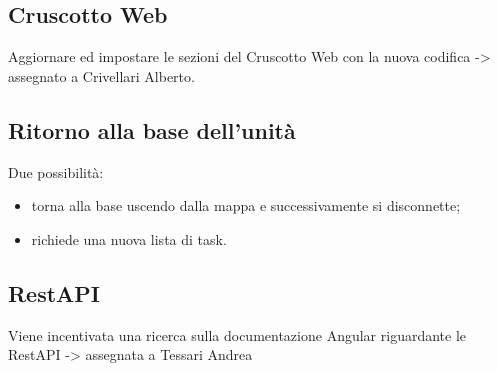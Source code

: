 \subsection{Cruscotto Web}
Aggiornare ed impostare le sezioni del Cruscotto Web con la nuova codifica -> assegnato a Crivellari Alberto.

\subsection{Ritorno alla base dell'unità}
Due possibilità:
\begin{itemize}
	\item torna alla base uscendo dalla mappa e successivamente si disconnette;
	\item richiede una nuova lista di task.
\end{itemize}

\subsection{RestAPI}
Viene incentivata una ricerca sulla documentazione Angular riguardante le RestAPI -> assegnata a Tessari Andrea